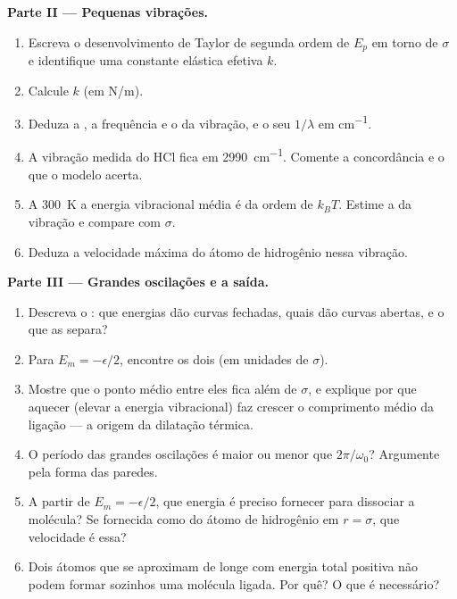 \begin{problem}
\medskip
\noindent\textbf{Parte II --- Pequenas vibrações.}
\begin{enumerate}[resume]
  \item Escreva o desenvolvimento de Taylor de segunda ordem de $E_p$ em torno de $\sigma$
        e identifique uma constante elástica efetiva $k$.
  \item Calcule $k$ (em \unit{N/m}).
  \item Deduza a , a frequência e o 
        da vibração, e o seu  $1/\lambda$ em \unit{cm^{-1}}.
  \item A vibração medida do HCl fica em \qty{2990}{cm^{-1}}. Comente
        a concordância e o que o modelo acerta.
  \item A \qty{300}{K} a energia vibracional média é da ordem de $k_BT$.
        Estime a  da vibração e compare com $\sigma$.
  \item Deduza a velocidade máxima do átomo de hidrogênio nessa
        vibração.
\end{enumerate}

\medskip
\noindent\textbf{Parte III --- Grandes oscilações e a saída.}
\begin{enumerate}[resume]
  \item Descreva o : que energias dão curvas fechadas,
        quais dão curvas abertas, e o que as separa?
  \item Para $E_m = -\epsilon/2$, encontre os dois  (em unidades
        de $\sigma$).
  \item Mostre que o ponto médio entre eles fica além de $\sigma$, e explique por que
        aquecer (elevar a energia vibracional) faz crescer o comprimento
        médio da ligação --- a origem da dilatação térmica.
  \item O período das grandes oscilações é maior ou menor que
        $2\pi/\omega_0$? Argumente pela forma das paredes.
  \item A partir de $E_m = -\epsilon/2$, que energia é preciso fornecer para
        dissociar a molécula? Se fornecida como  do
        átomo de hidrogênio em $r = \sigma$, que velocidade é essa?
  \item Dois átomos que se aproximam de longe com energia total positiva
        não podem formar sozinhos uma molécula ligada. Por quê? O que é necessário?
\end{enumerate}


\end{problem}
